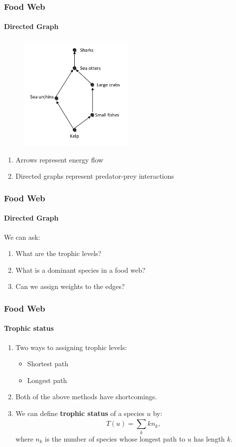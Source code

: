 \documentclass[aspectratio=43,leqno]{beamer}
\begin{document}
\begin{frame}
  \frametitle{Food Web}
  \framesubtitle{Directed Graph}
  \pause
  
  \begin{figure}[h]
    \centering
    \includegraphics[width=0.5\textwidth]{images/food-web.png}
    \label{fig:mesh1}
  \end{figure}
  \pause
  
\begin{enumerate}
\item\label{item:4} Arrows represent energy flow \pause
\item\label{item:5} Directed graphs represent predator-prey interactions
\end{enumerate}
\end{frame}

\begin{frame}
  \frametitle{Food Web}
  \framesubtitle{Directed Graph}

  We can ask: 
\begin{enumerate}
\item\label{item:7} What are the trophic levels? \pause
\item\label{item:8} What is a dominant species in a food web? \pause 
\item\label{item:9} Can we assign weights to the edges?
\end{enumerate}
\end{frame}

\begin{frame}
  \frametitle{Food Web}
  \framesubtitle{Trophic status}
  
\begin{enumerate}
\item\label{item:10} Two ways to assigning trophic levels: 
\begin{itemize}
\item Shortest path 
\item Longest path \pause
\end{itemize} 
\item\label{item:12} Both of the above methods have shortcomings. \pause
\item\label{item:11} We can define \textbf{trophic status} of a species $u$ by: 
\begin{displaymath}
T(u) = \sum_k^{} kn_k,
\end{displaymath}
where $n_k$ is the number of species whose longest path to $u$ has length $k$.
\end{enumerate} 
\end{frame}
\end{document}
